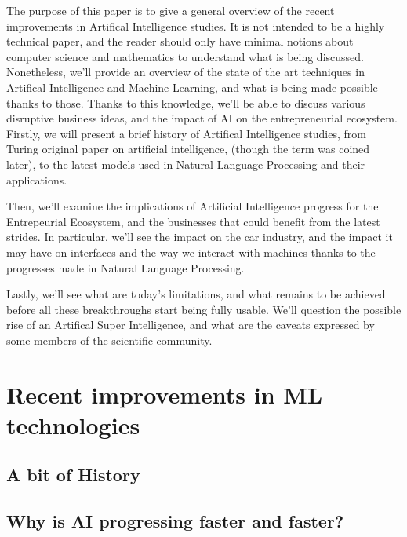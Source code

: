 \documentclass[12pt]{article}
\begin{document}
The purpose of this paper is to give a general overview of the recent
improvements in Artifical Intelligence studies. It is not intended to be a
highly technical paper, and the reader should only have minimal notions about
computer science and mathematics to understand what is being discussed.
Nonetheless, we'll provide an overview of the state of the art
techniques in Artifical Intelligence and Machine Learning, and what is being
made possible thanks to those. Thanks to this knowledge, we'll be able to
discuss various disruptive business ideas, and the impact of AI on the
entrepreneurial ecosystem.
\\

Firstly, we will present a brief history of Artifical
Intelligence studies, from Turing original paper on artificial intelligence,
(though the term was coined later), to the latest models used in Natural
Language Processing and their applications.

\noindent Then, we'll examine the implications of Artificial Intelligence
progress for the Entrepeurial Ecosystem, and the businesses that could benefit
from the latest strides. In particular, we'll see the impact on the car
industry, and the impact it may have on interfaces and the way we interact with
machines thanks to the progresses made in Natural Language Processing.

\noindent Lastly, we'll see what are today's limitations, and what remains to be
achieved before all these breakthroughs start being fully usable. We'll question
the possible rise of an Artifical Super Intelligence, and what are the caveats
expressed by some members of the scientific community.

\pagebreak


\section{Recent improvements in ML technologies}

\subsection{A bit of History}


\subsection{Why is AI progressing faster and faster?}
\end{document}
